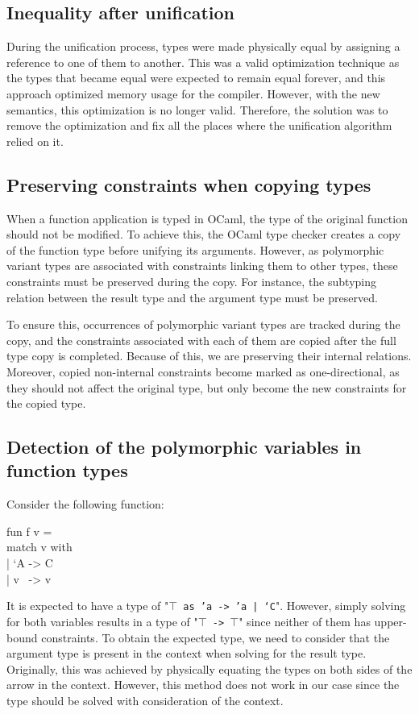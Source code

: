 \documentclass[a4paper,11pt,oneside]{article}
\theoremstyle{definition}
\begin{document}
\subsection{Inequality after unification}

During the unification process, types were made physically equal by
assigning a reference to one of them to another. This was a valid
optimization technique as the types that became equal were expected to
remain equal forever, and this approach optimized memory usage for the
compiler. However, with the new semantics, this optimization is no longer
valid. Therefore, the solution was to remove the optimization and fix all
the places where the unification algorithm relied on it.

\subsection{Preserving constraints when copying types}

When a function application is typed in OCaml, the type of the original
function should not be modified. To achieve this, the OCaml type checker
creates a copy of the function type before unifying its arguments. However,
as polymorphic variant types are associated with constraints linking them
to other types, these constraints must be preserved during the copy. For
instance, the subtyping relation between the result type and the argument
type must be preserved.

To ensure this, occurrences of polymorphic variant types are tracked during
the copy, and the constraints associated with each of them are copied after
the full type copy is completed. Because of this, we are preserving their
internal relations. Moreover, copied non-internal constraints become marked
as one-directional, as they should not affect the original type, but only
become the new constraints for the copied type.

\subsection{Detection of the polymorphic variables in function types}

Consider the following function:

{\ttfamily
fun f v =\\
match v with\\
| `A -> C\\
| v \ -> v
}

It is expected to have a type of "\texttt{$\top$ as 'a -> 'a | `C}".
However, simply solving for both variables results in a type of
"\texttt{$\top$ -> $\top$}" since neither of them has upper-bound constraints.
To obtain the expected type, we need to consider that the argument type is
present in the context when solving for the result type. Originally, this was
achieved by physically equating the types on both sides of the arrow in the
context. However, this method does not work in our case since the type should
be solved with consideration of the context.
\end{document}
